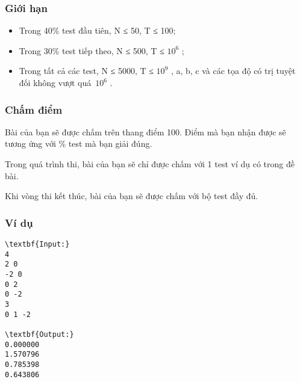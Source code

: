 \subsubsection{   Giới hạn  }
\begin{itemize}
	\item     Trong 40\% test đầu tiên, N ≤ 50, T ≤ 100;   
	\item     Trong 30\% test tiếp theo, N ≤ 500, T ≤ $10^{6}$    ;   
	\item     Trong tất cả các test, N ≤ 5000, T ≤ $10^{9}$    , a, b, c và các tọa độ có trị tuyệt đối không vượt quá $10^{6}$    .   
\end{itemize}

\subsubsection{   Chấm điểm  }

   Bài của bạn sẽ được chấm trên thang điểm 100. Điểm mà bạn nhận được sẽ tương ứng với \% test mà bạn giải đúng.  

   Trong quá trình thi, bài của bạn sẽ chỉ được chấm với 1 test ví dụ có trong đề bài.  

   Khi vòng thi kết thúc, bài của bạn sẽ được chấm với bộ test đầy đủ.  
\begin{itemize}
\end{itemize}

\subsubsection{   Ví dụ  }
\begin{verbatim}
\textbf{Input:}
4
2 0
-2 0
0 2
0 -2
3
0 1 -2

\textbf{Output:}
0.000000
1.570796
0.785398
0.643806
\end{verbatim}
